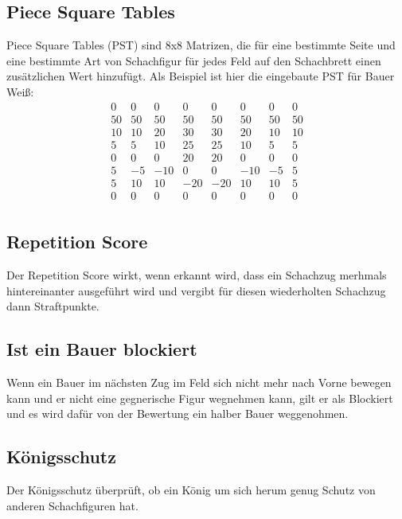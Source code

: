 \subsection{Piece Square Tables}
Piece Square Tables (PST) sind  8x8 Matrizen, die für eine bestimmte Seite und eine bestimmte Art von Schachfigur für jedes Feld auf den Schachbrett einen zusätzlichen Wert hinzuf\"ugt.
\newline Als Beispiel ist hier die eingebaute PST für Bauer Weiß: 
$$
\begin{matrix}
         0 &  0 &  0 &  0 &  0 &  0 &  0 &  0 \\
        50 & 50 & 50 & 50 & 50 & 50 & 50 & 50 \\
        10 & 10 & 20 & 30 & 30 & 20 & 10 & 10 \\
         5 &  5 & 10 & 25 & 25 & 10 &  5 &  5 \\
         0 &  0 &  0 & 20 & 20 &  0 &  0 &  0 \\
         5 & -5 &-10 &  0 &  0 &-10 & -5 &  5 \\
         5 & 10 & 10 &-20 &-20 & 10 & 10 &  5 \\
         0 &  0 &  0 &  0 &  0 &  0 &  0 &  0 \\
\end{matrix}
$$

\subsection{Repetition Score}
Der Repetition Score wirkt, wenn erkannt wird, dass ein Schachzug merhmals hintereinanter ausgef\"uhrt wird und vergibt für diesen wiederholten Schachzug dann Straftpunkte.
\subsection{Ist ein Bauer blockiert}
Wenn ein Bauer im nächsten Zug im Feld sich nicht mehr nach Vorne bewegen kann und er nicht eine gegnerische Figur wegnehmen kann, gilt er als Blockiert und es wird dafür von der Bewertung ein halber Bauer weggenohmen.

\subsection{Königsschutz}
Der Königsschutz überprüft, ob ein König um sich herum genug Schutz von anderen Schachfiguren hat.
